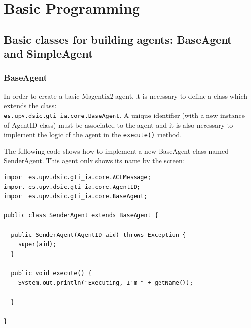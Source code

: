 \chapter{Basic Programming} \label{chap:programmingAgents}
%



\section{Basic classes for building agents: BaseAgent and SimpleAgent}

\subsection{BaseAgent}\label{sec:BaseAgent}

In order to create a basic Magentix2 agent, it is necessary to define a class which extends the class:\\ \lstinline|es.upv.dsic.gti_ia.core.BaseAgent|. A unique identifier (with a new instance of AgentID class) must be associated to the agent and it is also necessary to  implement the logic of the agent in the \lstinline|execute()| method.

The following code shows how to implement a new BaseAgent class named SenderAgent. This agent only shows its name by the screen:

\begin{lstlisting}
import es.upv.dsic.gti_ia.core.ACLMessage;
import es.upv.dsic.gti_ia.core.AgentID;
import es.upv.dsic.gti_ia.core.BaseAgent;

public class SenderAgent extends BaseAgent {

  public SenderAgent(AgentID aid) throws Exception {
	super(aid);
  }

  public void execute() {
	System.out.println("Executing, I'm " + getName());

  }

}
\end{lstlisting}

